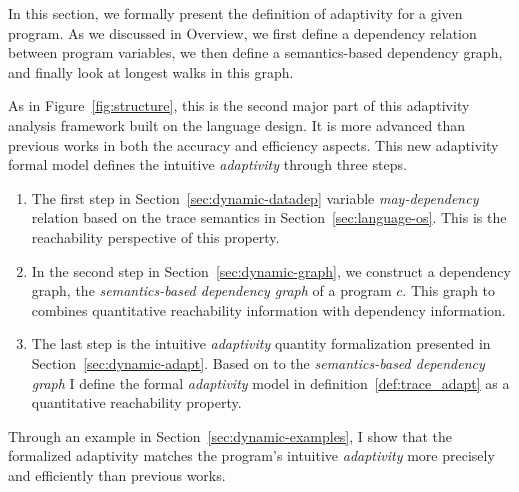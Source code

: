 
In this section, we formally present the definition of adaptivity for a given program.
As we discussed in Overview, we first define a dependency relation between program variables,
we then define a semantics-based dependency graph, and finally look at longest walks in this graph. 

As in Figure~\ref{fig:structure}, this is the second major part of this adaptivity analysis framework
built on the language design. 
It is more advanced than previous works
in both the accuracy and efficiency aspects.
This new adaptivity formal model defines the intuitive \emph{adaptivity} through three steps.

 \begin{enumerate}
 \item The first step in 
 Section~\ref{sec:dynamic-datadep} 
 variable \emph{may-dependency} relation based on the trace semantics in Section~\ref{sec:language-os}.
 This is the reachability perspective of this property.
 \item In the second step in Section~\ref{sec:dynamic-graph}, we construct a dependency graph,
the \emph{semantics-based dependency graph} of a program $c$. 
This graph to combines quantitative reachability information with dependency information. 

\item The last step is the intuitive \emph{adaptivity} quantity formalization presented in Section~\ref{sec:dynamic-adapt}.
 Based on to the \emph{semantics-based dependency graph}
 I define the formal \emph{adaptivity} model in definition~\ref{def:trace_adapt} as a quantitative reachability property.
\end{enumerate}
 Through an example in Section~\ref{sec:dynamic-examples}, I show that the formalized
adaptivity matches the program's intuitive \emph{adaptivity} more precisely and efficiently than previous works.
